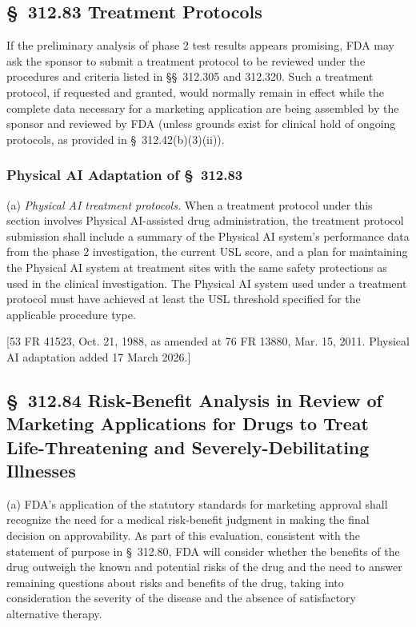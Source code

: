 \subsection{\S~312.83 Treatment Protocols}

If the preliminary analysis of phase 2 test results appears promising, FDA may ask the sponsor to submit a treatment protocol to be reviewed under the procedures and criteria listed in \S\S~312.305 and 312.320. Such a treatment protocol, if requested and granted, would normally remain in effect while the complete data necessary for a marketing application are being assembled by the sponsor and reviewed by FDA (unless grounds exist for clinical hold of ongoing protocols, as provided in \S~312.42(b)(3)(ii)).

\subsubsection{Physical AI Adaptation of \S~312.83}

(a) \textit{Physical AI treatment protocols.} When a treatment protocol under this section involves Physical AI-assisted drug administration, the treatment protocol submission shall include a summary of the Physical AI system's performance data from the phase 2 investigation, the current USL score, and a plan for maintaining the Physical AI system at treatment sites with the same safety protections as used in the clinical investigation. The Physical AI system used under a treatment protocol must have achieved at least the USL threshold specified for the applicable procedure type.

[53 FR 41523, Oct. 21, 1988, as amended at 76 FR 13880, Mar. 15, 2011. Physical AI adaptation added 17 March 2026.]

\subsection{\S~312.84 Risk-Benefit Analysis in Review of Marketing Applications for Drugs to Treat Life-Threatening and Severely-Debilitating Illnesses}

(a) FDA's application of the statutory standards for marketing approval shall recognize the need for a medical risk-benefit judgment in making the final decision on approvability. As part of this evaluation, consistent with the statement of purpose in \S~312.80, FDA will consider whether the benefits of the drug outweigh the known and potential risks of the drug and the need to answer remaining questions about risks and benefits of the drug, taking into consideration the severity of the disease and the absence of satisfactory alternative therapy.

